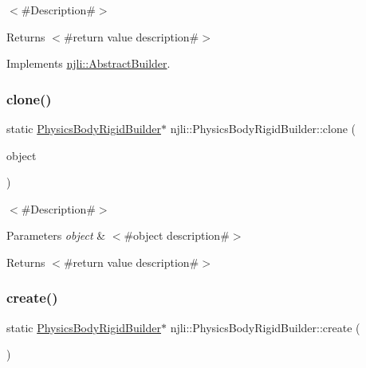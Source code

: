 $<$\#\+Description\#$>$

\begin{DoxyReturn}{Returns}
$<$\#return value description\#$>$ 
\end{DoxyReturn}


Implements \mbox{\hyperlink{classnjli_1_1_abstract_builder_aa1d220053e182c37b31b427499c6eacf}{njli\+::\+Abstract\+Builder}}.

\mbox{\label{classnjli_1_1_physics_body_rigid_builder_a20e077423efb4ff6ea1c8325129809b0}} 
\subsubsection{\texorpdfstring{clone()}{clone()}}
{\footnotesize\ttfamily static \mbox{\hyperlink{classnjli_1_1_physics_body_rigid_builder}{Physics\+Body\+Rigid\+Builder}}$\ast$ njli\+::\+Physics\+Body\+Rigid\+Builder\+::clone (\begin{DoxyParamCaption}\item[{const \mbox{\hyperlink{classnjli_1_1_physics_body_rigid_builder}{Physics\+Body\+Rigid\+Builder}} \&}]{object }\end{DoxyParamCaption})\hspace{0.3cm}{\ttfamily [static]}}

$<$\#\+Description\#$>$


\begin{DoxyParams}{Parameters}
{\em object} & $<$\#object description\#$>$\\
\hline
\end{DoxyParams}
\begin{DoxyReturn}{Returns}
$<$\#return value description\#$>$ 
\end{DoxyReturn}
\mbox{\label{classnjli_1_1_physics_body_rigid_builder_a0e839f557f35c6fcb76de21ad7161f1d}} 
\subsubsection{\texorpdfstring{create()}{create()}}
{\footnotesize\ttfamily static \mbox{\hyperlink{classnjli_1_1_physics_body_rigid_builder}{Physics\+Body\+Rigid\+Builder}}$\ast$ njli\+::\+Physics\+Body\+Rigid\+Builder\+::create (\begin{DoxyParamCaption}{ }\end{DoxyParamCaption})\hspace{0.3cm}{\ttfamily [static]}}

